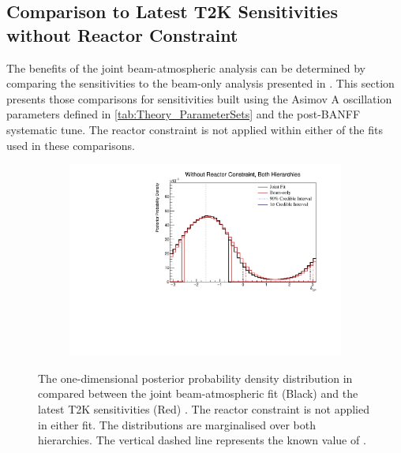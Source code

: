 \clearpage
\subsection{Comparison to Latest T2K Sensitivities without Reactor Constraint}
\label{sec:OscillationAnalysis_JointFit_OA2020}

The benefits of the joint beam-atmospheric analysis can be determined by comparing the sensitivities to the beam-only analysis presented in \cite{Dunne2020-uf, t2k_tn_393}. This section presents those comparisons for sensitivities built using the Asimov A oscillation parameters defined in \autoref{tab:Theory_ParameterSets} and the post-BANFF systematic tune. The reactor constraint is not applied within either of the fits used in these comparisons.

\begin{figure}[h]
  \begin{subfigure}[t]{0.98\textwidth}
    \includegraphics[width=\textwidth, trim={0mm 0mm 0mm 0mm}, clip,page=1]{Figures/OA/JointFit_OA2020_Comp/ContourComparison_1D_dcp_BH_2_woRC_UnSmeared_CredibleInterval.pdf}
  \end{subfigure}
  \caption{The one-dimensional posterior probability density distribution in  compared between the joint beam-atmospheric fit (Black) and the latest T2K sensitivities (Red) \cite{Dunne2020-uf, t2k_tn_393}. The reactor constraint is not applied in either fit. The distributions are marginalised over both hierarchies. The vertical dashed line represents the known value of .}
  \label{fig:OscillationAnalysis_JointFit_OA2020_DCP}
\end{figure}

